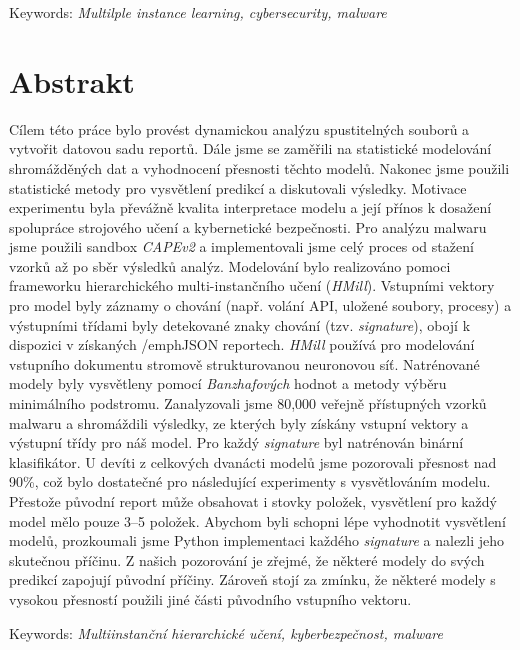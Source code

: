 \documentclass[11pt,twoside,a4paper]{book}
\begin{document}
	\vspace{5mm}

	\noindent Keywords: \emph{Multilple instance learning, cybersecurity, malware}

	\let\cleardoublepage\clearpage

	\noindent
	\chapter*{Abstrakt}
	\noindent
	Cílem této práce bylo provést dynamickou analýzu spustitelných souborů a vytvořit datovou sadu reportů. Dále jsme se zaměřili na statistické modelování shromážděných dat a vyhodnocení přesnosti těchto modelů. Nakonec jsme použili statistické metody pro vysvětlení predikcí a diskutovali výsledky. Motivace experimentu byla převážně kvalita interpretace modelu a její přínos k dosažení spolupráce strojového učení a kybernetické bezpečnosti. Pro analýzu malwaru jsme použili sandbox \emph{CAPEv2} a implementovali jsme celý proces od stažení vzorků až po sběr výsledků analýz. Modelování bylo realizováno pomoci frameworku hierarchického multi-instančního učení (\emph{HMill}). Vstupními vektory pro model byly záznamy o chování (např. volání API, uložené soubory, procesy) a výstupními třídami byly detekované znaky chování (tzv. \emph{signature}), obojí k dispozici v získaných /emph{JSON} reportech. \emph{HMill} používá pro modelování vstupního dokumentu stromově strukturovanou neuronovou síť. Natrénované modely byly vysvětleny pomocí \emph{Banzhafových} hodnot a metody výběru minimálního podstromu. Zanalyzovali jsme 80,000 veřejně přístupných vzorků malwaru a shromáždili výsledky, ze kterých byly získány vstupní vektory a výstupní třídy pro náš model. Pro každý \emph{signature} byl natrénován binární klasifikátor. U devíti z celkových dvanácti modelů jsme pozorovali přesnost nad 90\%, což bylo dostatečné pro následující experimenty s vysvětlováním modelu. Přestože původní report může obsahovat i stovky položek, vysvětlení pro každý model mělo pouze 3--5 položek. Abychom byli schopni lépe vyhodnotit vysvětlení modelů, prozkoumali jsme Python implementaci každého \emph{signature} a nalezli jeho skutečnou příčinu. Z našich pozorování je zřejmé, že některé modely do svých predikcí zapojují původní příčiny. Zároveň stojí za zmínku, že některé modely s vysokou přesností použili jiné části původního vstupního vektoru.

	\vspace{5mm}

	\noindent Keywords: \emph{Multiinstanční hierarchické učení, kyberbezpečnost, malware}
\end{document}
